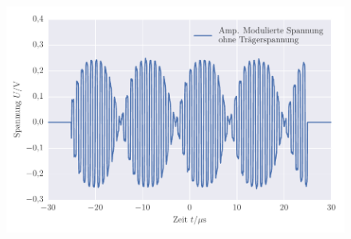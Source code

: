 
\FloatBarrier\begin{figure}[!h]
\centering
\includegraphics[scale=1]{../Grafiken/Amplituden_Modulierte_Spannung_ohne_Traeger.pdf}
\caption{\label{fig:amplituden_modulierte_spannung_ohne_traeger}}
\end{figure}
\FloatBarrier